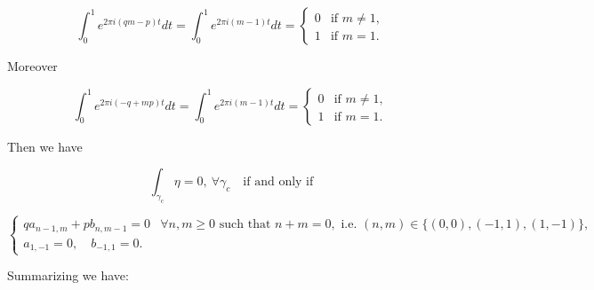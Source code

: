 \documentclass[11pt,a4paper]{amsart}
\theoremstyle{definition}
\begin{document}
\[
\int_0^1 e^{2\pi i(qm-p)t}dt
=
\int_0^1 e^{2\pi i(m-1)t}dt
=
\begin{cases}
0 & \text{if } m\neq 1,\\
1 & \text{if } m=1.
\end{cases}
\]

Moreover

\[
\int_0^1 e^{2\pi i(-q+mp)t}dt
=
\int_0^1 e^{2\pi i(m-1)t}dt
=
\begin{cases}
0 & \text{if } m\neq 1,\\
1 & \text{if } m=1.
\end{cases}
\]

Then we have

\[
\int_{\gamma_c}\eta=0,\ \forall \gamma_c
\quad \text{if and only if}
\]

\[
\begin{cases}
q a_{n-1,m}+p b_{n,m-1}=0
& \forall n,m\ge0 \text{ such that } n+m=0,
\text{ i.e. } (n,m)\in\{(0,0),(-1,1),(1,-1)\},\\[6pt]
a_{1,-1}=0,\quad b_{-1,1}=0.
\end{cases}
\]

Summarizing we have:
\end{document}
